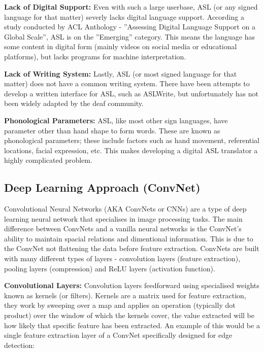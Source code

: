 \documentclass[11pt]{article}
\def\paraskip{\vskip 0.4cm}
\begin{document}
        \paraskip

        \noindent\textbf{Lack of Digital Support:} Even with such a large userbase, ASL (or any signed language for that matter) severly lacks digital language support. According a study conducted by ACL Anthology - ”Assessing Digital Language Support on a Global Scale”, ASL is on the ”Emerging” category. This means the language has some content in digital form (mainly videos on social media or educational platforms), but lacks programs for machine interpretation.

        \paraskip

        \noindent\textbf{Lack of Writing System:} Lastly, ASL (or most signed language for that matter) does not have a common writing system. There have been attempts to develop a written interface for ASL, such as ASLWrite, but unfortunately has not been widely adapted by the deaf community.

        \paraskip

        \noindent\textbf{Phonological Parameters:} ASL, like most other sign languages, have parameter other than hand shape to form words. These are known as phonological parameters; these include factors such as hand movement, referential locations, facial expression, etc. This makes developing a digital ASL translator a highly complicated problem. 


    \subsection{Deep Learning Approach (ConvNet)}
        Convolutional Neural Networks (AKA ConvNets or CNNs) are a type of deep learning neural network that specialises in image processing tasks. The main difference between ConvNets and a vanilla neural networks is the ConvNet's ability to maintain spacial relations and dimentional information. This is due to the ConvNet not flattening the data before feature extraction. ConvNets are built with many different types of layers - convolution layers (feature extraction), pooling layers (compression) and ReLU layers (activation function).

        \paraskip

        \noindent\textbf{Convolutional Layers: } Convolution layers feedforward using specialised weights known as kernels (or filters). Kernels are a matrix used for feature extraction, they work by sweeping over a map and applies an operation (typically dot product) over the window of which the kernels cover, the value extracted will be how likely that specific feature has been extracted. An example of this would be a single feature extraction layer of a ConvNet specifically designed for edge detection: 
\end{document}
